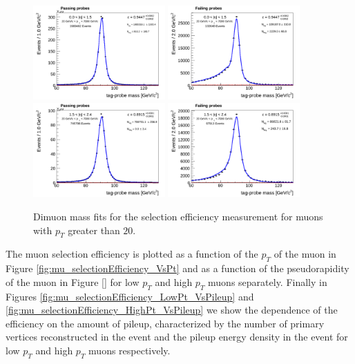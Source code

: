 \begin{figure}[!htbp]
\begin{center}
\includegraphics[width=0.45\textwidth]{figures/MuonSelectionEffMassFitPass_EtaPtBin4.pdf}
\includegraphics[width=0.45\textwidth]{figures/MuonSelectionEffMassFitFail_EtaPtBin4.pdf}
\includegraphics[width=0.45\textwidth]{figures/MuonSelectionEffMassFitPass_EtaPtBin5.pdf}
\includegraphics[width=0.45\textwidth]{figures/MuonSelectionEffMassFitFail_EtaPtBin5.pdf}
\caption{Dimuon mass fits for the selection efficiency measurement for muons with
$p_{T}$ greater than $20$\GeV.}
\label{fig:mu_selectionEfficiency_massfits_highPt}
\end{center}
\end{figure}


The muon selection efficiency is plotted as a function of the $p_{T}$ of the muon in Figure 
\ref{fig:mu_selectionEfficiency_VsPt} and as a function of the pseudorapidity of the muon
in Figure \ref{} for low $p_{T}$ and high $p_{T}$ muons separately. Finally in Figures
\ref{fig:mu_selectionEfficiency_LowPt_VsPileup} and \ref{fig:mu_selectionEfficiency_HighPt_VsPileup}
we show the dependence of the efficiency on the amount of pileup, characterized by the
number of primary vertices reconstructed in the event and the pileup energy density 
in the event for low $p_{T}$ and high $p_{T}$ muons respectively.

